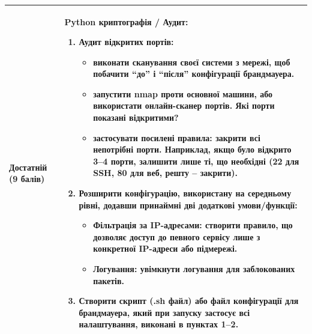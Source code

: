 \begin{longtable}{
  | >{\raggedright\arraybackslash}p{} 
  | >{\raggedright\arraybackslash}p{} |
}
\cellcolor{TableBodyGreen}
\small \textbf{Достатній} (9 балів) &
\small \textbf{Python криптографія / Аудит:}
\begin{enumerate}
    \item Аудит відкритих портів: \vspace{-0.5em}
    \begin{itemize}
        \item виконати сканування своєї системи з мережі, щоб побачити “до” і “після” конфігурації брандмауера. \vspace{-0.5em}
        \item запустити nmap проти основної машини, або використати онлайн-сканер портів. Які порти показані відкритими? \vspace{-0.5em}
        \item застосувати посилені правила: закрити всі непотрібні порти. Наприклад, якщо було відкрито 3–4 порти, залишити лише ті, що необхідні (22 для SSH, 80 для веб, решту – закрити).
    \end{itemize} 
    
    \item Розширити конфігурацію, використану на середньому рівні, додавши принаймні дві додаткові умови/функції: \vspace{-0.5em}
    \begin{itemize}
        \item Фільтрація за IP-адресами: створити правило, що дозволяє доступ до певного сервісу лише з конкретної IP-адреси або підмережі. \vspace{-0.5em}
        \item Логування: увімкнути логування для заблокованих пакетів.
    \end{itemize} 
    \item Створити скрипт (.sh файл) або файл конфігурації для брандмауера, який при запуску застосує всі налаштування, виконані в пунктах 1–2.
    
\end{enumerate} \\ \hline


\end{longtable}
